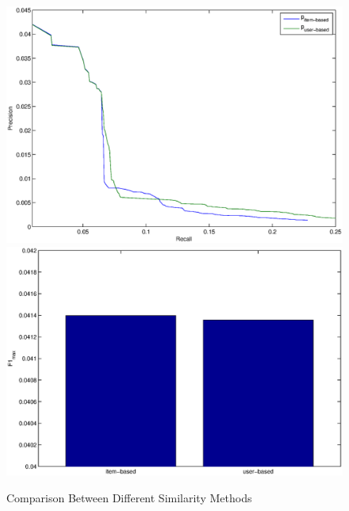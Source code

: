 \documentclass[11pt,a4paper,titlepage]{article}
\begin{document}
\begin{figure}[!h]
\includegraphics[width=\linewidth]{./base.eps}
\includegraphics[width=\linewidth]{./base_f1.eps}
\caption{Comparison Between Different Similarity Methods}
\label{pic:usercomp}
\end{figure}


\clearpage


\end{document}

